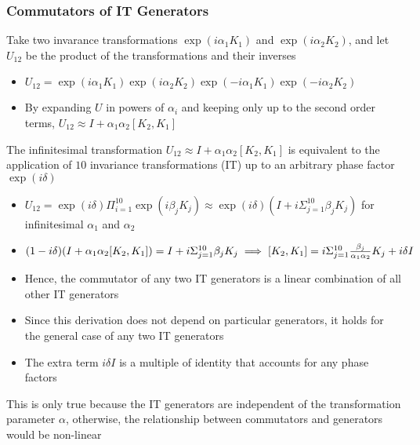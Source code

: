 \documentclass[8pt,t,mathserif,aspectratio=169]{beamer}
\begin{document}
\begin{frame}
  \frametitle{Commutators of IT Generators}
  \vspace{1mm}
  Take two invarance transformations $\exp(i \alpha_1 K_1)$ and $\exp(i \alpha_2 K_2)$, and let $U_{12}$ be the product of the transformations and their inverses
  \begin{itemize}
    \item $U_{12} = \exp(i \alpha_1 K_1) \exp(i \alpha_2 K_2) \exp(-i \alpha_1 K_1) \exp(-i \alpha_2 K_2)$
    \item By expanding $U$ in powers of $\alpha_i$ and keeping only up to the second order terms, $U_{12} \approx I + \alpha_1 \alpha_2 [K_2,K_1]$
  \end{itemize}
  The infinitesimal transformation $U_{12} \approx I + \alpha_1 \alpha_2 [K_2,K_1]$ is equivalent to the application of $10$ invariance transformations (IT) up to an arbitrary phase factor $\exp(i \delta)$
  \begin{itemize}
    \item $U_{12} = \exp(i \delta) \Pi_{i = 1}^{10} \exp(i \beta_j K_j) \approx \exp(i \delta) (I + i \Sigma_{j = 1}^{10} \beta_j K_j)$ for infinitesimal $\alpha_1$ and $\alpha_2$
    \item $(1 - i \delta)(I + \alpha_1 \alpha_2 [K_2,K_1]) = I + i \Sigma_{j = 1}^{10} \beta_j K_j \implies [K_2,K_1] =  i \Sigma_{j = 1}^{10} {\beta_j \over \alpha_1 \alpha_2} K_j + i \delta I$
    \item Hence, the commutator of any two IT generators is a linear combination of all other IT generators
    \item Since this derivation does not depend on particular generators, it holds for the general case of any two IT generators
    \item The extra term $i \delta I$ is a multiple of identity that accounts for any phase factors
  \end{itemize}
  This is only true because the IT generators are independent of the transformation parameter $\alpha$, otherwise, the relationship between commutators and generators would be non-linear
\end{frame}
\end{document}
